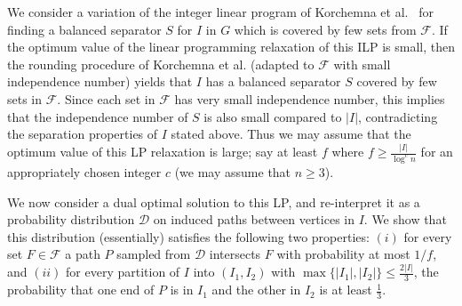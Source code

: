 \documentclass[11pt]{amsart}
\newcommand{\cal}{\mathcal}
\begin{document}
We consider a variation of the integer linear program of Korchemna et al.~\cite{KorchemnaL0S024} for finding a balanced separator $S$ for $I$ in $G$ which is covered by few sets from ${\cal F}$. 
If the optimum value of the linear programming relaxation of this ILP is small, then the rounding procedure of Korchemna et al. (adapted to ${\cal F}$ with small independence number) yields that $I$ has a balanced separator $S$ covered by few sets in ${\cal F}$. 
%
Since each set in ${\cal F}$ has very small independence number, this implies that the independence number of $S$ is also small compared to $|I|$, contradicting the separation properties of $I$ stated above. 
%
Thus we may assume that the optimum value of this LP relaxation is large;   say at least $f$ where $f \geq \frac{|I|}{\log^cn}$  for
an appropriately chosen integer $c$ (we may assume that $n \geq 3$). 

We now consider a dual optimal solution to this LP, and re-interpret it as a probability distribution ${\cal D}$ on induced paths between vertices in $I$. We show that this distribution (essentially) satisfies the following two properties: $(i)$ for every set $F \in {\cal F}$ a path $P$ sampled from ${\cal D}$ intersects $F$ with probability at most $1/f$, and $(ii)$ for every partition of $I$ into $(I_1, I_2)$ with $\max\{|I_1|, |I_2|\} \leq \frac{2|I|}{3}$, the probability that one end of $P$ is in $I_1$ and the other in $I_2$ is at least $\frac{1}{3}$.
\end{document}
